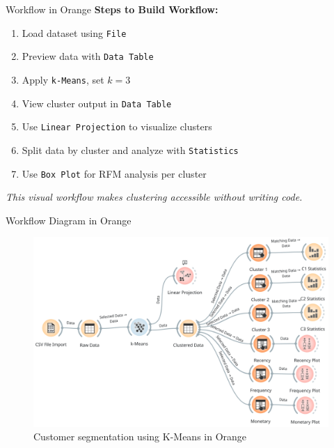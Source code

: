 \documentclass[aspectratio=169, table]{beamer}
\begin{document}
\begin{frame}{Workflow in Orange}
	\textbf{Steps to Build Workflow:}
	
	\begin{enumerate}
		\item Load dataset using \texttt{File}
		\item Preview data with \texttt{Data Table}
		\item Apply \texttt{k-Means}, set \(k = 3\)
		\item View cluster output in \texttt{Data Table}
		\item Use \texttt{Linear Projection} to visualize clusters
		\item Split data by cluster and analyze with \texttt{Statistics}
		\item Use \texttt{Box Plot} for RFM analysis per cluster
	\end{enumerate}
	
	\textit{This visual workflow makes clustering accessible without writing code.}
\end{frame}

\begin{frame}{Workflow Diagram in Orange}
	\begin{figure}
		\centering
		\includegraphics[width=.9\linewidth]{../../figures/clustering.png}
		\caption{Customer segmentation using K-Means in Orange}
		\label{fig:clustering-orange}
	\end{figure}
\end{frame}
\end{document}

